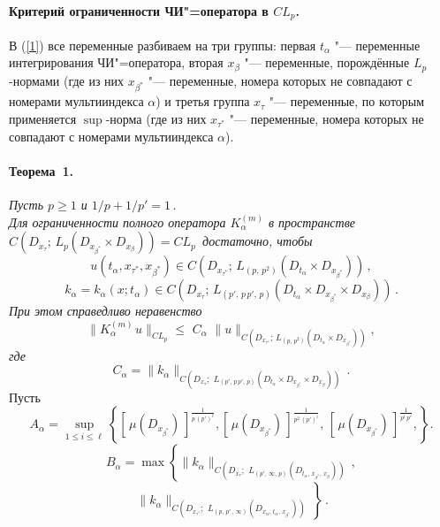 \paragraph{Критерий ограниченности ЧИ"=оператора в $CL_p$.}
В (\ref{1}) все переменные разбиваем на три группы: первая $t_\alpha$ "--- переменные интегрирования ЧИ"=оператора, вторая  $x_\beta$ "--- переменные, порождённые $L_p$-нормами (где из них $x_{\beta^*}$ "--- переменные, номера которых не совпадают с номерами мультииндекса $\alpha$) и третья группа $x_{\tau}$ "--- переменные, по которым применяется $\sup$-норма (где из них $x_{\tau^*}$ "--- переменные, номера которых не совпадают с номерами мультииндекса $\alpha$).

\paragraph{Теорема~1.}
 {\it Пусть $p \geq1$ и $1/p+1/p'=1$\,. \\
 Для ограниченности полного оператора $K_\alpha^{(m)}$  в пространстве
$C(D_{x_\tau};\,L_{{p}}( D_{x_{\beta^*}} {\times}  D_{x_{\beta}}))=CL_{p}\,$
достаточно, чтобы
$$
u(t_\alpha,x_{\tau^*},x_{\beta^*})\in
C(D_{x_{\tau^{*}}};\,L_{(p,\, p^2)}(D_{t_\alpha}{\times} D_{x_{\beta^*}} ))\,,
$$
$$
k_\alpha=k_\alpha(x;t_\alpha)\in C(D_{x_\tau};\,L_{(p',\,p\, p',\,p)}(D_{t_\alpha}{\times} D_{x_{\beta^*}}{\times} D_{x_{\beta}} ))\,.
$$
При этом справедливо неравенство
$$
\|K_{\alpha}^{(m)\,} u\|_{CL_{p}}
{\leq}\,\, C_{\alpha} \,\,\|u\|_{C(D_{x_{\tau^*}};\,L_{(p,\,p^2)}(D_{t_\alpha}\times D_{x_{\beta^*}}))},
$$
где
$$
  C_{\alpha}= \|k_{\alpha}\|_{C(D_{x_\tau};\,\, L_{(p',\,p\, p',\, p)}(D_{t_\alpha}\times D_{x_{\beta^*}}\times D_{x_\beta}))}\,.
$$}
 Пусть
$$
A_\alpha=\sup\limits_{1\leq i\leq {\ell}}\left\{[\,\mu(D_{x_{\beta^*}})\,]^{\frac{1}{p \, (p')^\ell}}, [\,\mu(D_{x_{\beta^*}})\,]^{\frac{1}{p^2\,(p')^i}},\, [\,\mu(D_{x_{\beta^*}})\,]^{\frac{1}{p^i \, p'}},\right\}.
$$
$$
B_\alpha= \max \left\{\|k_\alpha\|_{C(D_{x_\tau};\,\, L_{(p',\, \infty,\, p)}(D_{t_\alpha,\, x_{\beta^*},\,x_{\beta}}))}\,,\right.
$$
$$
\,\left.\|k_\alpha\|_{ C(D_{x_{\tau^*}};\,\, L_{(p,\, p'\,,\, \infty)}(D_{x_\alpha,\, t_{\alpha},\,x_{\beta^*}}))}\, \right\}\,.
$$
